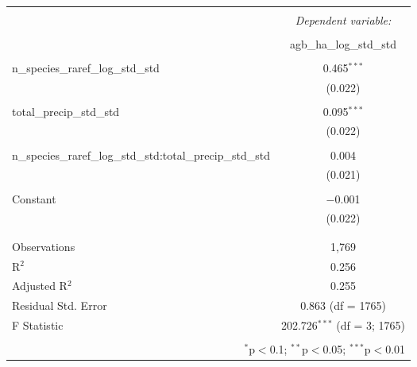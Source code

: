 
\begin{table}[!htbp] \centering 
  \caption{} 
  \label{mois_div_int_mod} 
\begin{tabular}{@{\extracolsep{5pt}}lc} 
\\[-1.8ex]\hline 
\hline \\[-1.8ex] 
 & \multicolumn{1}{c}{\textit{Dependent variable:}} \\ 
\cline{2-2} 
\\[-1.8ex] & agb\_ha\_log\_std\_std \\ 
\hline \\[-1.8ex] 
 n\_species\_raref\_log\_std\_std & 0.465$^{***}$ \\ 
  & (0.022) \\ 
  & \\ 
 total\_precip\_std\_std & 0.095$^{***}$ \\ 
  & (0.022) \\ 
  & \\ 
 n\_species\_raref\_log\_std\_std:total\_precip\_std\_std & 0.004 \\ 
  & (0.021) \\ 
  & \\ 
 Constant & $-$0.001 \\ 
  & (0.022) \\ 
  & \\ 
\hline \\[-1.8ex] 
Observations & 1,769 \\ 
R$^{2}$ & 0.256 \\ 
Adjusted R$^{2}$ & 0.255 \\ 
Residual Std. Error & 0.863 (df = 1765) \\ 
F Statistic & 202.726$^{***}$ (df = 3; 1765) \\ 
\hline 
\hline \\[-1.8ex] 
\multicolumn{2}{r}{$^{*}$p$<$0.1; $^{**}$p$<$0.05; $^{***}$p$<$0.01} \\ 
\end{tabular} 
\end{table} 
